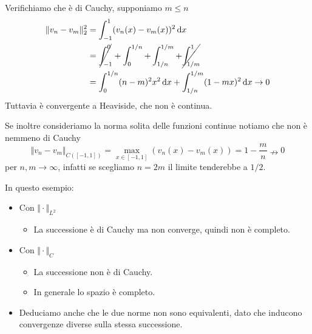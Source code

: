 \documentclass[10pt,a4paper,twoside,openright]{book}
\newcommand{\de}{\,\mathrm d}
\newcommand{\dx}{\de x}
\begin{document}
\begin{itemize}
\begin{figure}[htpb]
\begin{tikzpicture}[x=0.75pt,y=0.75pt,yscale=-1,xscale=1]
              \end{tikzpicture}

          \end{figure}
          \FloatBarrier

          Verifichiamo che è di Cauchy, supponiamo $\displaystyle m\leqslant n$
          \begin{align*}
              \Vert v_{n} -v_{m}\Vert _{2}^{2} & =\int _{-1}^{1}(v_{n}(x) -v_{m}(x))^{2} \dx                                            \\
                                               & =\cancel{\int _{-1}^{0}} +\int _{0}^{1/n} +\int _{1/n}^{1/m} +\cancel{\int _{1/m}^{1}} \\
                                               & =\int _{0}^{1/n}(n-m)^{2} x^{2} \dx+\int _{1/n}^{1/m}(1-mx)^{2} \dx\rightarrow 0
          \end{align*}Tuttavia è convergente a Heaviside, che non è continua.

          Se inoltre consideriamo la norma solita delle funzioni continue notiamo che non è nemmeno di Cauchy
          \begin{equation*}
              \Vert v_{n} -v_{m}\Vert _{C([ -1,1])} =\max_{x\in [ -1,1]}(v_{n}(x) -v_{m}(x)) =1-\frac{m}{n} \nrightarrow 0
          \end{equation*}per $n,m\rightarrow \infty $, infatti se scegliamo $n=2m$ il limite tenderebbe a $1/2$.
\end{itemize}

In questo esempio:
\begin{itemize}
    \item Con $\displaystyle \Vert \cdotp \Vert _{L^{2}}$
          \begin{itemize}
              \item La successione è di Cauchy ma non converge, quindi non è completo.
          \end{itemize}
    \item Con $\Vert \cdotp \Vert _{C}$
          \begin{itemize}
              \item La successione non è di Cauchy.
              \item In generale lo spazio è completo.
          \end{itemize}
    \item Deduciamo anche che le due norme non sono equivalenti, dato che inducono convergenze diverse sulla stessa successione.
\end{itemize}
\end{document}
